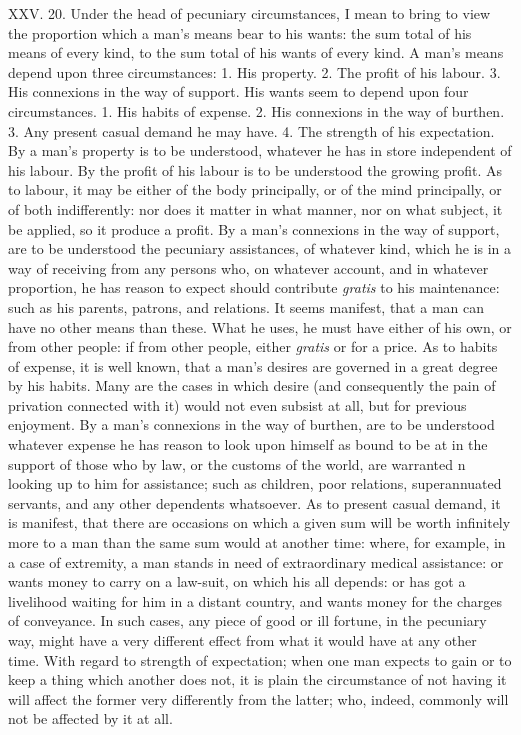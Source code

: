 \documentclass[12pt]{report}
\begin{document}
XXV. 20. Under the head of pecuniary circumstances, I mean to bring to
view the proportion which a man's means bear to his wants: the sum total
of his means of every kind, to the sum total of his wants of every kind.
A man's means depend upon three circumstances: 1. His property. 2. The
profit of his labour. 3. His connexions in the way of support. His wants
seem to depend upon four circumstances. 1. His habits of expense. 2. His
connexions in the way of burthen. 3. Any present casual demand he may
have. 4. The strength of his expectation. By a man's property is to be
understood, whatever he has in store independent of his labour. By the
profit of his labour is to be understood the growing profit. As to
labour, it may be either of the body principally, or of the mind
principally, or of both indifferently: nor does it matter in what
manner, nor on what subject, it be applied, so it produce a profit. By a
man's connexions in the way of support, are to be understood the
pecuniary assistances, of whatever kind, which he is in a way of
receiving from any persons who, on whatever account, and in whatever
proportion, he has reason to expect should contribute \emph{gratis} to
his maintenance: such as his parents, patrons, and relations. It seems
manifest, that a man can have no other means than these. What he uses,
he must have either of his own, or from other people: if from other
people, either \emph{gratis} or for a price. As to habits of expense, it
is well known, that a man's desires are governed in a great degree by
his habits. Many are the cases in which desire (and consequently the
pain of privation connected with it) would not even subsist at all, but
for previous enjoyment. By a man's connexions in the way of burthen, are
to be understood whatever expense he has reason to look upon himself as
bound to be at in the support of those who by law, or the customs of the
world, are warranted n looking up to him for assistance; such as
children, poor relations, superannuated servants, and any other
dependents whatsoever. As to present casual demand, it is manifest, that
there are occasions on which a given sum will be worth infinitely more
to a man than the same sum would at another time: where, for example, in
a case of extremity, a man stands in need of extraordinary medical
assistance: or wants money to carry on a law-suit, on which his all
depends: or has got a livelihood waiting for him in a distant country,
and wants money for the charges of conveyance. In such cases, any piece
of good or ill fortune, in the pecuniary way, might have a very
different effect from what it would have at any other time. With regard
to strength of expectation; when one man expects to gain or to keep a
thing which another does not, it is plain the circumstance of not having
it will affect the former very differently from the latter; who, indeed,
commonly will not be affected by it at all.
\end{document}
